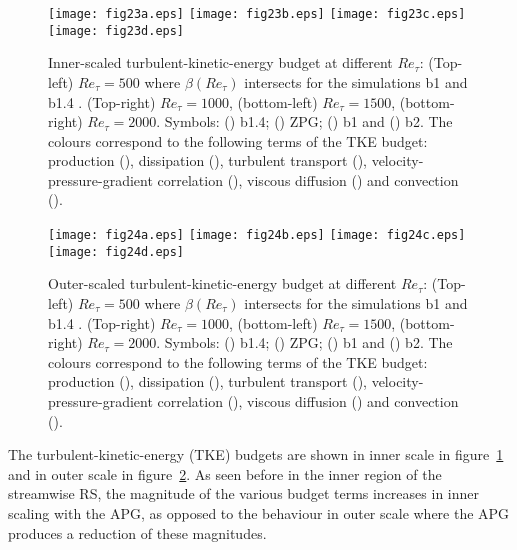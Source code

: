 \begin{figure}
\texttt{[image: fig23a.eps]}
\texttt{[image: fig23b.eps]}
\texttt{[image: fig23c.eps]}
\texttt{[image: fig23d.eps]}
  \caption{ Inner-scaled turbulent-kinetic-energy budget at different $Re_{\tau}$: (Top-left) $Re_{\tau}=500$ where $\beta(Re_{\tau})$ intersects for the simulations b1 and b1.4 . (Top-right) $Re_{\tau}=1000$, (bottom-left) $Re_{\tau}=1500$, (bottom-right) $Re_{\tau}=2000$. Symbols: (\protect\blackline) b1.4; (\protect\blackdotted) ZPG; (\protect\blackdash) b1 and (\protect\blackdashdot) b2. The colours correspond to the following terms of the TKE budget: production (\protect\blueline), dissipation (\protect\greenline), turbulent transport (\protect\yellowline), velocity-pressure-gradient correlation (\protect\orangeline), viscous diffusion (\protect\magentaline) and convection (\protect\blackline).}
\label{fig:TKEinner}
\end{figure}


\begin{figure}
\texttt{[image: fig24a.eps]}
\texttt{[image: fig24b.eps]}
\texttt{[image: fig24c.eps]}
\texttt{[image: fig24d.eps]}
  \caption{ Outer-scaled turbulent-kinetic-energy budget at different $Re_{\tau}$: (Top-left) $Re_{\tau}=500$ where $\beta(Re_{\tau})$ intersects for the simulations b1 and b1.4 . (Top-right) $Re_{\tau}=1000$, (bottom-left) $Re_{\tau}=1500$, (bottom-right) $Re_{\tau}=2000$. Symbols: (\protect\blackline) b1.4; (\protect\blackdotted) ZPG; (\protect\blackdash) b1 and (\protect\blackdashdot) b2. The colours correspond to the following terms of the TKE budget: production (\protect\blueline), dissipation (\protect\greenline), turbulent transport (\protect\yellowline), velocity-pressure-gradient correlation (\protect\orangeline), viscous diffusion (\protect\magentaline) and convection (\protect\blackline).}
\label{fig:TKEouter}
\end{figure}

 
The turbulent-kinetic-energy (TKE) budgets are shown in inner scale in figure~\ref{fig:TKEinner} and in outer scale in figure~\ref{fig:TKEouter}. As seen before in the inner region of the streamwise RS, the magnitude of the various budget terms increases in inner scaling with the APG, as opposed to the behaviour in outer scale where the APG produces a reduction of these magnitudes. 

